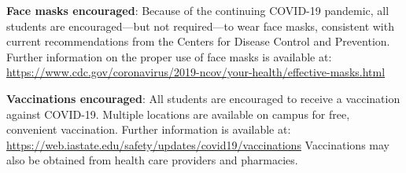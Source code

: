 \documentclass[10pt]{article}
\newcommand{\sep}{\vspace*{0.4cm}}
\begin{document}
%
%
% 
%

\textbf{Face masks encouraged}: Because of the continuing COVID-19 pandemic, all students are encouraged—but not required—to wear face masks, consistent with current recommendations from the Centers for Disease Control and Prevention. Further information on the proper use of face masks is available at: \url{https://www.cdc.gov/coronavirus/2019-ncov/your-health/effective-masks.html}
\sep

\textbf{Vaccinations encouraged}: All students are encouraged to receive a vaccination against COVID-19. Multiple locations are available on campus for free, convenient vaccination. Further information is available at: \url{https://web.iastate.edu/safety/updates/covid19/vaccinations} Vaccinations may also be obtained from health care providers and pharmacies.
\sep
\end{document}
